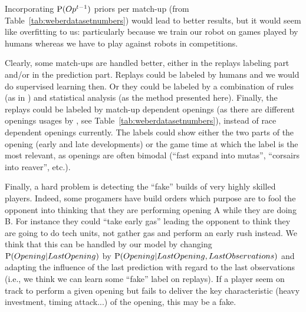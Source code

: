 Incorporating $\mathrm{P}(Op^{t-1})$ priors per match-up (from Table~\ref{tab:weberdatasetnumbers}) would lead to better results, but it would seem like overfitting to us: particularly because we train our robot on games played by humans whereas we have to play against robots in competitions.


Clearly, some match-ups are handled better, either in the replays labeling part and/or in the prediction part. Replays could be labeled by humans and we would do supervised learning then. Or they could be labeled by a combination of rules (as in \citep{weberStrat}) and statistical analysis (as the method presented here). Finally, the replays could be labeled by match-up dependent openings (as there are different openings usages by , see Table~\ref{tab:weberdatasetnumbers}), instead of race dependent openings currently. The labels could show either the two parts of the opening (early and late developments) 
or the game time at which the label is the most relevant, as openings are often bimodal (``fast expand into mutas'', ``corsairs into reaver'', etc.).

Finally, a hard problem is detecting the ``fake'' builds of very highly skilled players. Indeed, some progamers have build orders which purpose are to fool the opponent into thinking that they are performing opening A while they are doing B. For instance they could ``take early gas'' leading the opponent to think they are going to do tech units, not gather gas 
and perform an early rush instead. We think that this can be handled by our model by changing $\mathrm{P}(Opening|LastOpening)$ by $\mathrm{P}(Opening|LastOpening, LastObservations)$ and adapting the influence of the last prediction with regard to the last observations (i.e., we think we can learn some ``fake'' label on replays). If a player seem on track to perform a given opening but fails to deliver the key characteristic (heavy investment, timing attack...) of the opening, this may be a fake.


